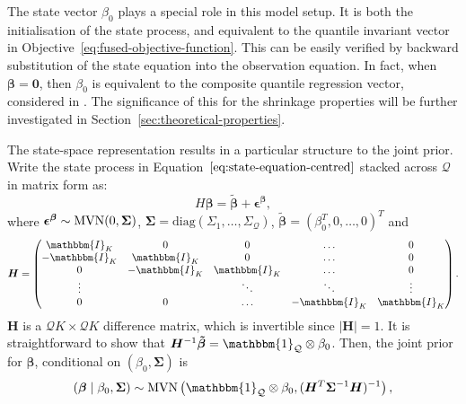 The state vector $\beta_0$ plays a special role in this model setup. It is both the initialisation of the state process, and equivalent to the quantile invariant vector in Objective~\ref{eq:fused-objective-function}. This can be easily verified by backward substitution of the state equation into the observation equation. In fact, when $\mathbf{\beta}=\boldsymbol{0}$, then $\beta_0$ is equivalent to the composite quantile regression vector, considered in \citet{zou2008composite}. The significance of this for the shrinkage properties will be further investigated in Section~\ref{sec:theoretical-properties}.
%

The state-space representation results in a particular structure to the joint prior. Write the state process in Equation~$\ref{eq:state-equation-centred}$ stacked across $\mathcal{Q}$ in matrix form as:
%
\begin{equation}
    H\boldsymbol{\beta} = \tilde{\boldsymbol{\beta}} + \boldsymbol{\epsilon^{\beta}},
\end{equation}
%
where $\boldsymbol{\epsilon^{\beta}} \sim \mathrm{MVN}(0,\boldsymbol{\Sigma})$, $\boldsymbol{\Sigma} = \mathrm{diag}(\Sigma_1,\dotsc,\Sigma_{\mathcal{Q}})$, $\boldsymbol{\tilde{\beta}} = (\beta_0^T,0,\dotsc,0)^T$ and
%
\begin{equation}
    \boldsymbol{H} = 
    \begin{pmatrix}
        \mathbbm{I}_{K} & 0 & 0 & \dotsc & 0 \\ 
        -\mathbbm{I}_{K} & \mathbbm{I}_{K} & 0 & \dotsc & 0 \\ 
        0 & -\mathbbm{I}_{K} & \mathbbm{I}_{K} & \dotsc & 0 \\
        \vdots &  & \ddots & \ddots & \vdots \\
        0 & 0 & \dotsc & -\mathbbm{I}_{K} & \mathbbm{I}_{K} \\
    \end{pmatrix}.
\end{equation}
%
$\boldsymbol{H}$ is a $\mathcal{Q}K \times \mathcal{Q}K$ difference matrix, which is invertible since $|\boldsymbol{H}| = 1$. It is straightforward to show that $\boldsymbol{H}^{-1}\boldsymbol{\tilde{\beta}} = \mathbbm{1}_{\mathcal{Q}} \otimes \beta_0$. Then, the joint prior for $\boldsymbol{\beta}$, conditional on $\left(\beta_0,\boldsymbol{\Sigma}\right)$ is
%
\begin{equation}
    (\boldsymbol{\beta}\mid \beta_0,\boldsymbol{\Sigma}) \sim \mvn\left(\mathbbm{1}_{\mathcal{Q}} \otimes \beta_0,(\boldsymbol{H}^T\boldsymbol{\Sigma}^{-1}\boldsymbol{H})^{-1}\right),
\end{equation}
